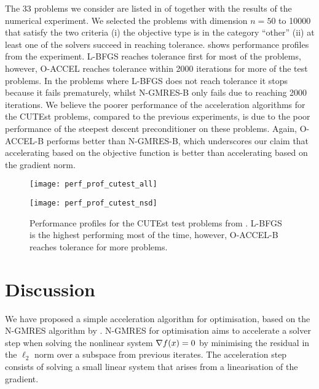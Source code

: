 \documentclass[main.tex]{subfiles}
\begin{document}
The \num{33} problems we consider are listed in
 of  together
with the results of the numerical experiment.  We selected the
problems with dimension $n=50$ to \num{10000} that satisfy the two
criteria (i) the objective type is in the category ``other'' (ii) at
least one of the solvers succeed in reaching tolerance.
 shows performance profiles from the
experiment. L-BFGS reaches tolerance first for most of the problems,
however, O-ACCEL reaches tolerance within \num{2000} iterations for
more of the test problems. In the problems where L-BFGS does not reach
tolerance it stops because it fails prematurely, whilst N-GMRES-B only
fails due to reaching \num{2000} iterations.  We believe the poorer
performance of the acceleration algorithms for the CUTEst problems,
compared to the previous experiments, is due to the poor performance
of the steepest descent preconditioner on these problems.  Again,
O-ACCEL-B performs better than N-GMRES-B, which underscores our claim
that accelerating based on the objective function is better than
accelerating based on the gradient norm.
\begin{figure}[htb]
  \centering
  \begin{minipage}{0.499\textwidth}
    \texttt{[image: perf\_prof\_cutest\_all]}
  \end{minipage}%
  \begin{minipage}{0.499\textwidth}
    \texttt{[image: perf\_prof\_cutest\_nsd]}
  \end{minipage}
  \caption[Performance profiles for the CUTEst test problems]{Performance profiles for the CUTEst test problems from
    .  L-BFGS is the highest
    performing most of the time, however, O-ACCEL-B reaches tolerance
    for more problems.}\label{fig:perf_prof_cutest}
\end{figure}

\section{Discussion}\label{sec:conclusion}
We have proposed a simple acceleration algorithm for optimisation,
based on the N-GMRES algorithm by
\citet{washio1997krylov,sterck2013steepest}.  N-GMRES for optimisation
aims to accelerate a solver step when solving the nonlinear system
$\nabla f(x)=0$ by minimising the residual in the $\ell_2$ norm over
a subspace from previous iterates.  The acceleration step consists of
solving a small linear system that arises from a linearisation of the
gradient.
\end{document}
